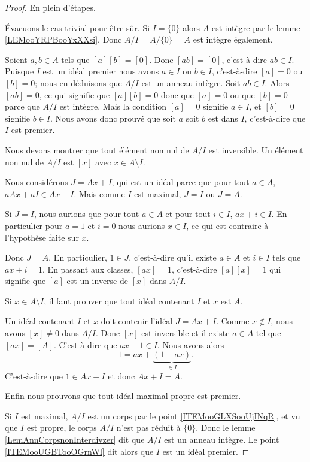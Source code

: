 \begin{proof}
	En plein d'étapes.
	\begin{subproof}
		Évacuons le cas trivial pour être sûr. Si \( I=\{ 0 \}\) alors \( A\) est intègre par le lemme \ref{LEMooYRPBooYxXXsi}. Donc \( A/I=A/\{ 0 \}=A\) est intègre également.

		Soient \( a,b\in A\) tels que \( [a][b]=[0]\). Donc \( [ab]=[0]\), c'est-à-dire \( ab\in I\). Puisque \( I\) est un idéal premier nous avons \( a\in I\) ou \( b\in I\), c'est-à-dire \( [a]=0\) ou \( [b]=0\); nous en déduisons que \( A/I\) est un anneau intègre.
		Soit \( ab\in I\). Alors \( [ab]=0\), ce qui signifie que \( [a][b]=0\) donc que \( [a]=0\) ou que \( [b]=0\) parce que \( A/I\) est intègre. Mais la condition \( [a]=0\) signifie \( a\in I\), et \( [b]=0\) signifie \( b\in I\). Nous avons donc prouvé que soit \( a\) soit \( b\) est dans \( I\), c'est-à-dire que \( I\) est premier.

		Nous devons montrer que tout élément non nul de \( A/I\) est inversible. Un élément non nul de \( A/I\) est \( [x]\) avec \( x\in A\setminus I\).

		Nous considérons \( J=Ax+I\), qui est un idéal parce que pour tout \( a\in A\), \( aAx+aI\in Ax+I\). Mais comme \( I\) est maximal, \( J=I\) ou \( J=A\).

		Si \( J=I\), nous aurions que pour tout \( a\in A\) et pour tout \( i\in I\), \( ax+i\in I\). En particulier pour \( a=1\) et \( i=0\) nous aurions \( x\in I\), ce qui est contraire à l'hypothèse faite sur \( x\).

		Donc \( J=A\). En particulier, \( 1\in J\), c'est-à-dire qu'il existe \( a\in A\) et \( i\in I\) tels que \( ax+i=1\). En passant aux classes, \( [ax]=1\), c'est-à-dire \( [a][x]=1\) qui signifie que \( [a]\) est un inverse de \( [x]\) dans \( A/I\).

		Si \( x\in A\setminus I\), il faut prouver que tout idéal contenant \( I\) et \( x\) est \( A\).

		Un idéal contenant \( I\) et \( x\) doit contenir l'idéal \( J=Ax+I\). Comme \( x\notin I\), nous avons \( [x]\neq 0\) dans \( A/I\). Donc \( [x] \) est inversible et il existe \( a\in A\) tel que \( [ax]=[A]\). C'est-à-dire que \( ax-1\in I\). Nous avons alors
		\begin{equation}
			1=ax+\underbrace{(1-ax)}_{\in I}.
		\end{equation}
		C'est-à-dire que \( 1\in Ax+I\) et donc \( Ax+I=A\).
	\end{subproof}
	Enfin nous prouvons que tout idéal maximal propre est premier.

	Si \( I\) est maximal, \( A/I\) est un corps par le point \ref{ITEMooGLXSooUjINqR}, et vu que \( I\) est propre, le corps \( A/I\) n'est pas réduit à \( \{ 0 \}\). Donc le lemme \ref{LemAnnCorpsnonInterdivzer} dit que \( A/I\) est un anneau intègre. Le point \ref{ITEMooUGBTooOGrnWl} dit alors que \( I\) est un idéal premier.
\end{proof}


